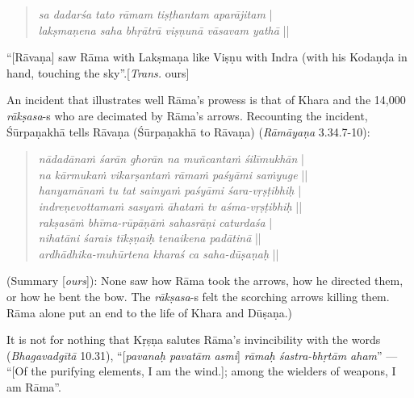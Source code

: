\begin{quote}
{{\sl sa dadarśa tato rāmam tiṣṭhantam aparājitam}}\label{verse44} |\\
{\sl lakṣmaṇena saha bhṛātrā viṣṇunā vāsavam yathā} || 
\end{quote}

\begin{myquote}
“[Rāvaṇa] saw Rāma with Lakṣmaṇa like Viṣṇu with Indra (with his Kodaṇḍa in hand, touching the sky”.\hfill [{\sl Trans.} ours]
\end{myquote}

An incident that illustrates well Rāma’s prowess is that of Khara and the 14,000 {\sl rākṣasa}-s who are decimated by Rāma’s arrows. Recounting the incident, Śūrpaṇakhā tells Rāvaṇa (Śūrpaṇakhā to Rāvaṇa) ({\sl Rāmāyaṇa} 3.34.7-10): 
\begin{quote}
{{\sl nādadānaṁ śarān ghorān na muñcantaṁ śilīmukhān}}\label{verse36} |\\
{\sl na kārmukaṁ vikarṣantaṁ rāmaṁ paśyāmi saṁyuge} ||\\
{\sl hanyamānaṁ tu tat sainyaṁ paśyāmi śara-vṛṣṭibhiḥ}\label{verse37} |\\
{\sl indreṇevottamaṁ sasyaṁ āhataṁ tv aśma-vṛṣṭibhiḥ} ||\\
{\sl rakṣasāṁ bhīma-rūpāṇāṁ sahasrāṇi caturdaśa}\label{verse38} |\\
{\sl nihatāni śarais tīkṣṇaiḥ tenaikena padātinā} ||\\
{\sl ardhādhika-muhūrtena kharaś ca saha-dūṣaṇaḥ}\label{verse39} ||
\end{quote}

\begin{myquote}
(Summary [{\sl ours}]): None saw how Rāma took the arrows, how he directed them, or how he bent the bow. The {\sl rākṣasa}-s felt the scorching arrows killing them. Rāma alone put an end to the life of Khara and Dūṣaṇa.)  
\end{myquote}

It is not for nothing that Kṛṣṇa salutes Rāma’s invincibility with the words ({\sl Bhagavadgītā} 10.31), “[{\sl pavanaḥ pavatām asmi}] {\sl rāmaḥ śastra-bhṛtām aham}” --- “[Of the purifying elements, I am the wind.]; among the wielders of weapons, I am Rāma”. 

